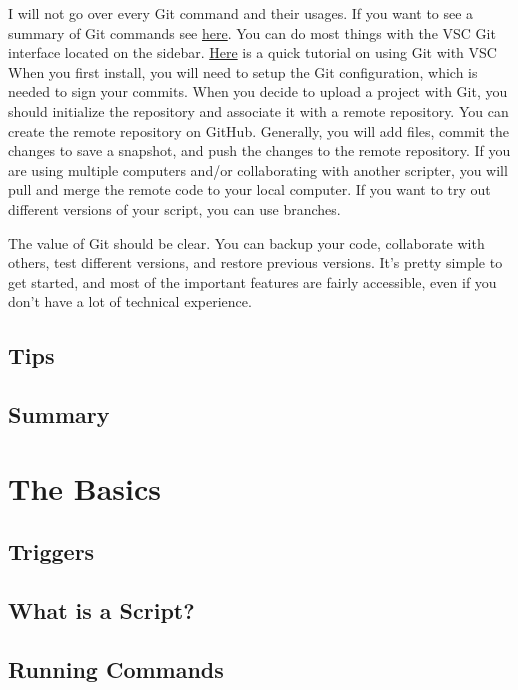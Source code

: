 \documentclass[oneside]{book}
\begin{document}
I will not go over every Git command and their usages. If you want to see a summary of Git commands see \href{https://education.github.com/git-cheat-sheet-education.pdf}{here}. You can do most things with the VSC Git interface located on the sidebar. \href{https://code.visualstudio.com/docs/sourcecontrol/overview}{Here} is a quick tutorial on using Git with VSC When you first install, you will need to setup the Git configuration, which is needed to sign your commits. When you decide to upload a project with Git, you should initialize the repository and associate it with a remote repository. You can create the remote repository on GitHub. Generally, you will add files, commit the changes to save a snapshot, and push the changes to the remote repository. If you are using multiple computers and/or collaborating with another scripter, you will pull and merge the remote code to your local computer. If you want to try out different versions of your script, you can use branches.

The value of Git should be clear. You can backup your code, collaborate with others, test different versions, and restore previous versions. It's pretty simple to get started, and most of the important features are fairly accessible, even if you don't have a lot of technical experience.

\section{Tips}
\blindtext

\section{Summary}
\blindtext

\chapter{The Basics}

\section{Triggers} \label{sec:triggers}
\blindtext

\section{What is a Script?}
\blindtext

\section{Running Commands}
\blindtext
\end{document}
